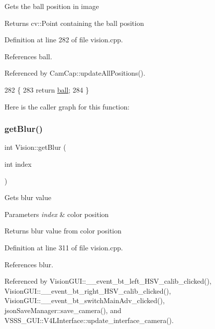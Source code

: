 Gets the ball position in image \begin{DoxyReturn}{Returns}
cv\+::\+Point containing the ball position 
\end{DoxyReturn}


Definition at line 282 of file vision.\+cpp.



References ball.



Referenced by Cam\+Cap\+::update\+All\+Positions().


\begin{DoxyCode}
282                         \{
283     \textcolor{keywordflow}{return} \hyperlink{class_vision_a525356abf07741955e63faffff9740af}{ball};
284 \}
\end{DoxyCode}
Here is the caller graph for this function\+:
\mbox{\label{class_vision_ad15cc7e3c696c7f52e30e7974337c74f}} 
\subsubsection{\texorpdfstring{get\+Blur()}{getBlur()}}
{\footnotesize\ttfamily int Vision\+::get\+Blur (\begin{DoxyParamCaption}\item[{int}]{index }\end{DoxyParamCaption})}

Gets blur value 
\begin{DoxyParams}{Parameters}
{\em index} & color position \\
\hline
\end{DoxyParams}
\begin{DoxyReturn}{Returns}
blur value from color position 
\end{DoxyReturn}


Definition at line 311 of file vision.\+cpp.



References blur.



Referenced by Vision\+G\+U\+I\+::\+\_\+\+\_\+event\+\_\+bt\+\_\+left\+\_\+\+H\+S\+V\+\_\+calib\+\_\+clicked(), Vision\+G\+U\+I\+::\+\_\+\+\_\+event\+\_\+bt\+\_\+right\+\_\+\+H\+S\+V\+\_\+calib\+\_\+clicked(), Vision\+G\+U\+I\+::\+\_\+\+\_\+event\+\_\+bt\+\_\+switch\+Main\+Adv\+\_\+clicked(), json\+Save\+Manager\+::save\+\_\+camera(), and V\+S\+S\+S\+\_\+\+G\+U\+I\+::\+V4\+L\+Interface\+::update\+\_\+interface\+\_\+camera().


